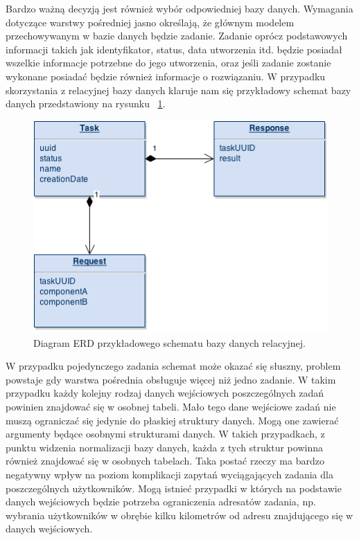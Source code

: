 Bardzo ważną decyzją jest również wybór odpowiedniej bazy danych. Wymagania dotyczące warstwy pośredniej jasno określają, że głównym modelem przechowywanym w bazie danych będzie zadanie. Zadanie oprócz podstawowych informacji takich jak identyfikator, status, data utworzenia itd. będzie posiadał wszelkie informacje potrzebne do jego utworzenia, oraz jeśli zadanie zostanie wykonane posiadać będzie również informacje o rozwiązaniu. W przypadku skorzystania z relacyjnej bazy danych klaruje nam się przykładowy schemat bazy danych przedstawiony na rysunku ~\ref{fig:erd}.

\begin{figure}[h]
\centerline{\includegraphics[scale=0.7]{erd}}
\caption{Diagram ERD przykładowego schematu bazy danych relacyjnej.}
\label{fig:erd}
\end{figure}

W przypadku pojedynczego zadania schemat może okazać się słuszny, problem powstaje gdy warstwa pośrednia obsługuje więcej niż jedno zadanie. W takim przypadku każdy kolejny rodzaj danych wejściowych poszczególnych zadań powinien znajdować się w osobnej tabeli. Mało tego dane wejściowe zadań nie muszą ograniczać się jedynie do płaskiej struktury danych. Mogą one zawierać argumenty będące osobnymi strukturami danych. W takich przypadkach, z punktu widzenia normalizacji bazy danych, każda z tych struktur powinna również znajdować się w osobnych tabelach.  Taka postać rzeczy ma bardzo negatywny wpływ na poziom komplikacji zapytań wyciągających zadania dla poszczególnych użytkowników. Mogą istnieć przypadki w których na podstawie danych wejściowych będzie potrzeba ograniczenia adresatów zadania, np. wybrania użytkowników w obrębie kilku kilometrów od adresu znajdującego się w danych wejściowych. 

